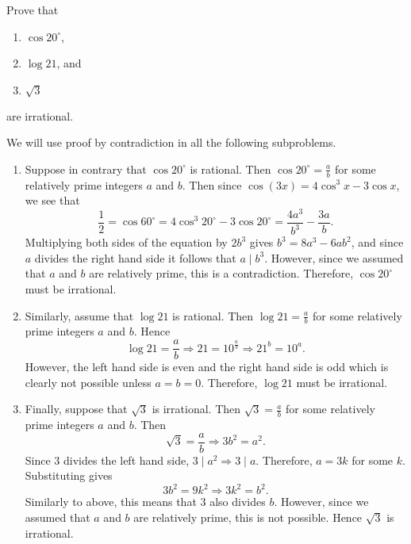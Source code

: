 \begin{question}
    Prove that
    \begin{enumerate}
        \item $\cos 20^\circ$,
        
        \item $\log 21$, and 
        
        \item $\sqrt{3}$ 
    \end{enumerate}
    are irrational.
\end{question}
\begin{solution}
    We will use proof by contradiction in all the following subproblems.
    \begin{enumerate}
        \item Suppose in contrary that $\cos 20^\circ$ is rational. Then $\cos
            20^\circ = \frac{a}{b}$ for some relatively prime integers $a$ and
            $b$. Then since $\cos(3x) = 4\cos^3 x - 3\cos x$, we see that
        \[ \frac{1}{2} = \cos 60^\circ = 4 \cos^3 20^\circ - 3\cos 20^\circ =
        \frac{4a^3}{b^3} - \frac{3a}{b}. \]
        Multiplying both sides of the equation by $2b^3$ gives $b^3 = 8a^3 -
        6ab^2$, and since $a$ divides the right hand side it follows that $a
        \mid b^3$. However, since we assumed that $a$ and $b$ are relatively
        prime, this is a contradiction. Therefore, $\cos 20^\circ$ must be
        irrational.

        \item Similarly, assume that $\log 21$ is rational. Then $\log 21 =
            \frac{a}{b}$ for some relatively prime integers $a$ and $b$. Hence
            \[ \log 21 = \frac{a}{b} \Longrightarrow 21 = 10^\frac{a}{b}
            \Longrightarrow 21^b = 10^a. \]
            However, the left hand side is even and the right hand side is odd
            which is clearly not possible unless $a = b = 0$. Therefore, $\log
            21$ must be irrational. 

        \item Finally, suppose that $\sqrt{3}$ is irrational. Then $\sqrt{3} =
            \frac{a}{b}$ for some relatively prime integers $a$ and $b$. Then 
            \[ \sqrt{3} = \frac{a}{b} \Longrightarrow 3b^2 = a^2. \]
            Since 3 divides the left hand side, $3 \mid a^2 \Rightarrow 3 \mid
            a$. Therefore, $a = 3k$ for some $k$. Substituting gives
            \[ 3b^2 = 9k^2 \Longrightarrow 3k^2 = b^2. \]
            Similarly to above, this means that 3 also divides $b$. However,
            since we assumed that $a$ and $b$ are relatively prime, this is not
            possible. Hence $\sqrt{3}$ is irrational. \qedhere
    \end{enumerate}
\end{solution}

